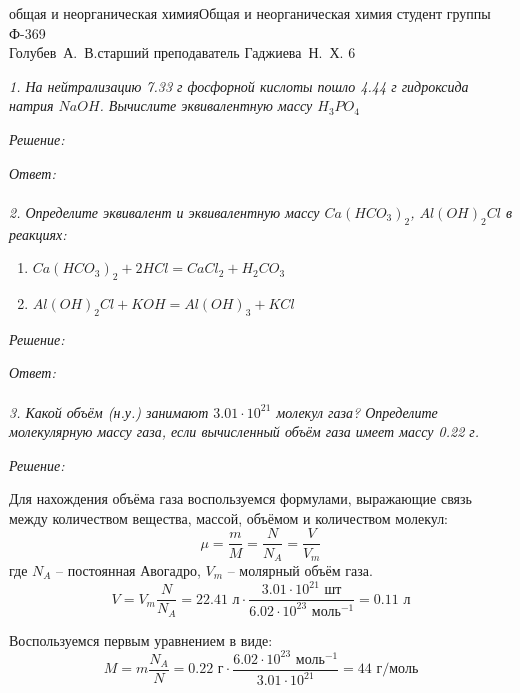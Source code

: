 






{общая и неорганическая химия}{Общая и неорганическая химия}
{студент группы Ф-369\\Голубев~А.~В.}{старший преподаватель Гаджиева~Н.~Х.}
{}{6}

\newpage

\emph{1. На нейтрализацию 7.33 г фосфорной кислоты пошло 4.44 г 
гидроксида натрия \( NaOH \). Вычислите эквивалентную массу 
\( H_3 PO_4 \)}

\emph{Решение:}

\emph{Ответ: } \\\\


\emph{2. Определите эквивалент и эквивалентную массу \( Ca(HCO_3)_2 \), 
\( Al(OH)_2Cl \) в реакциях:}
\begin{enumerate}
    \item \( Ca(HCO_3)_2 + 2HCl = CaCl_2 + H_2CO_3 \)
    \item \( Al(OH)_2Cl + KOH = Al(OH)_3 + KCl \)
\end{enumerate}

\emph{Решение:}

\emph{Ответ: } \\\\


\emph{3. Какой объём (н.у.) занимают \( 3.01\cdot10^{21} \) молекул 
газа? Определите молекулярную массу газа, если вычисленный объём газа 
имеет массу 0.22 г.}

\emph{Решение:}

Для нахождения объёма газа воспользуемся формулами, выражающие связь 
между количеством вещества, массой, объёмом и количеством молекул:
\[
	\mu = \frac{m}{M} = \frac{N}{N_A} = \frac{V}{V_m}
\]
где \( N_A \) -- постоянная Авогадро, \( V_m \) -- молярный объём газа.
\[
	V = V_m \frac{N}{N_A} = 22.41 \text{ л} \cdot 
	\frac{3.01\cdot10^{21} \text{ шт}}{6.02\cdot10^{23} \text{ моль}^{-1}} =
	0.11 \text{ л}
\]

Воспользуемся первым уравнением в виде:
\[
	M = m\frac{N_A}{N} = 0.22 \text{ г} \cdot  
	\frac{6.02\cdot10^{23} \text{ моль}^{-1}}{3.01\cdot10^{21}} =
	44 \text{ г/моль}
\]

